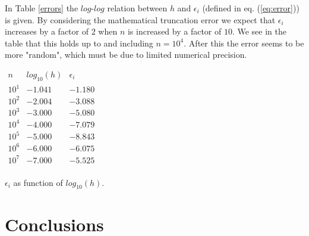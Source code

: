 \documentclass[12pt, a4paper]{article}
\begin{document}
In Table \ref{errors} the $log$-$log$ relation between $h$ and $\epsilon_i$ (defined in eq. 
(\ref{eq:error})) is given. By considering the mathematical truncation error we expect that $\epsilon_i$ 
increases by a factor of $2$ when $n$ is increased by a factor of $10$. We see in the table that this 
holds up to and including $n=10^4$. After this the error seems to be more "random", which must be due to 
limited numerical precision. 

\begin{table}[ht!]
\begin{center}
$\begin{array}{c|c|c} 
n & log_{10}(h) & \epsilon_i \\ \hline 
10^1 & -1.041 & -1.180 \\ 
10^2 & -2.004 & -3.088 \\ 
10^3 & -3.000 & -5.080 \\  
10^4 & -4.000 & -7.079 \\ 
10^5 & -5.000 & -8.843 \\ 
10^6 & -6.000 & -6.075 \\ 
10^7 & -7.000 & -5.525 \\ 
\end{array}$
\end{center}
\caption{$\epsilon_i$ as function of $log_{10}(h)$.}
\label{errors}
\end{table}



\section{Conclusions}
\end{document}
